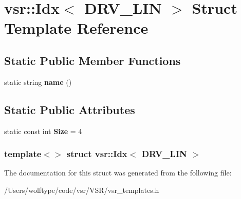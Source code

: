 \hypertarget{structvsr_1_1_idx_3_01_d_r_v___l_i_n_01_4}{\section{vsr\-:\-:Idx$<$ D\-R\-V\-\_\-\-L\-I\-N $>$ Struct Template Reference}
\label{structvsr_1_1_idx_3_01_d_r_v___l_i_n_01_4}
}
\subsection*{Static Public Member Functions}
\begin{DoxyCompactItemize}
\item 
\hypertarget{structvsr_1_1_idx_3_01_d_r_v___l_i_n_01_4_a347dd5582a702dea96b752a6caf698cd}{static string {\bfseries name} ()}\label{structvsr_1_1_idx_3_01_d_r_v___l_i_n_01_4_a347dd5582a702dea96b752a6caf698cd}

\end{DoxyCompactItemize}
\subsection*{Static Public Attributes}
\begin{DoxyCompactItemize}
\item 
\hypertarget{structvsr_1_1_idx_3_01_d_r_v___l_i_n_01_4_a9ba4dc13d1505d03e403dbbfdc9dfb1a}{static const int {\bfseries Size} = 4}\label{structvsr_1_1_idx_3_01_d_r_v___l_i_n_01_4_a9ba4dc13d1505d03e403dbbfdc9dfb1a}

\end{DoxyCompactItemize}
\subsubsection*{template$<$$>$ struct vsr\-::\-Idx$<$ D\-R\-V\-\_\-\-L\-I\-N $>$}



The documentation for this struct was generated from the following file\-:\begin{DoxyCompactItemize}
\item 
/\-Users/wolftype/code/vsr/\-V\-S\-R/vsr\-\_\-templates.\-h\end{DoxyCompactItemize}
